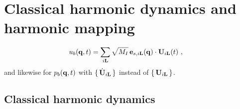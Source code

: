 
\section{Classical harmonic dynamics and harmonic mapping}

\begin{align}
u_b (\b q, t) 
& = \sum_{i \b L} \sqrt{M_I} \, \b e_{s, i\b L} (\b q) \cdot \b U_{i \b L} (t) ~,
\label{eq:mode.projection.u_b(q)}
\end{align}
and likewise for $p_b ({\bf q}, t)$ with $\set{\dot{{\bf U}}_{i {\bf L}}}$ instead of $\set{{\bf U}_{i {\bf L}}}$.

\subsection{Classical harmonic dynamics}

